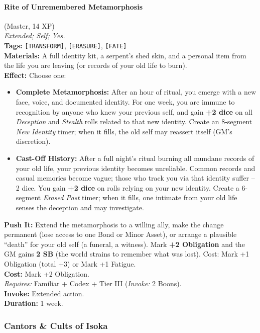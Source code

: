 \paragraph{Rite of Unremembered Metamorphosis} (Master, 14 XP) \hfill \\
\emph{Extended; Self; Yes.} \\
\textbf{Tags:} \texttt{[TRANSFORM]}, \texttt{[ERASURE]}, \texttt{[FATE]} \\
\textbf{Materials:} A full identity kit, a serpent's shed skin, and a personal item from the life you are leaving (or records of your old life to burn). \\
\textbf{Effect:} Choose one:
\begin{itemize}
  \item \textbf{Complete Metamorphosis:} After an hour of ritual, you emerge with a new face, voice, and documented identity. For one week, you are immune to recognition by anyone who knew your previous self, and gain \textbf{+2 dice} on all \textit{Deception} and \textit{Stealth} rolls related to that new identity. Create an 8-segment \textit{New Identity} timer; when it fills, the old self may reassert itself (GM's discretion).
  \item \textbf{Cast-Off History:} After a full night's ritual burning all mundane records of your old life, your previous identity becomes unreliable. Common records and casual memories become vague; those who track you via that identity suffer --2 dice. You gain \textbf{+2 dice} on rolls relying on your new identity. Create a 6-segment \textit{Erased Past} timer; when it fills, one intimate from your old life senses the deception and may investigate.
\end{itemize}
\textbf{Push It:} Extend the metamorphosis to a willing ally, make the change permanent (lose access to one Bond or Minor Asset), or arrange a plausible ``death'' for your old self (a funeral, a witness). Mark \textbf{+2 Obligation} and the GM gains \textbf{2 SB} (the world strains to remember what was lost). Cost: Mark +1 Obligation (total +3) or Mark +1 Fatigue. \\
\textbf{Cost:} Mark +2 Obligation. \\
\textit{Requires:} Familiar + Codex + Tier III (\textit{Invoke:} 2 Boons). \\
\textbf{Invoke:} Extended action. \\
\textbf{Duration:} 1 week.

\subsubsection*{Cantors \& Cults of Isoka}


